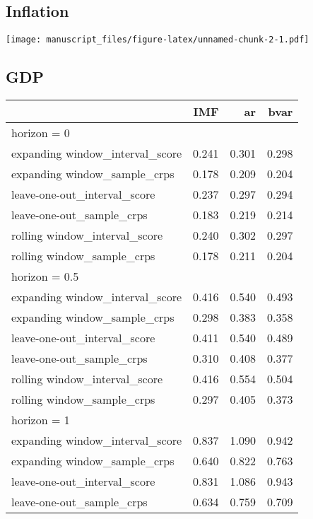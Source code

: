 \documentclass[
]{article}
\begin{document}
\hypertarget{inflation}{%
\subsection{Inflation}\label{inflation}}

\texttt{[image: manuscript\_files/figure-latex/unnamed-chunk-2-1.pdf]}

\hypertarget{gdp}{%
\subsection{GDP}\label{gdp}}

\begin{longtable}{l|rrr}
\toprule
\multicolumn{1}{l}{} & IMF & ar & bvar \\ 
\midrule
\multicolumn{4}{l}{horizon = 0} \\ 
\midrule
expanding window\_interval\_score & 0.241 & 0.301 & 0.298 \\ 
expanding window\_sample\_crps & 0.178 & 0.209 & 0.204 \\ 
leave-one-out\_interval\_score & 0.237 & 0.297 & 0.294 \\ 
leave-one-out\_sample\_crps & 0.183 & 0.219 & 0.214 \\ 
rolling window\_interval\_score & 0.240 & 0.302 & 0.297 \\ 
rolling window\_sample\_crps & 0.178 & 0.211 & 0.204 \\ 
\midrule
\multicolumn{4}{l}{horizon = 0.5} \\ 
\midrule
expanding window\_interval\_score & 0.416 & 0.540 & 0.493 \\ 
expanding window\_sample\_crps & 0.298 & 0.383 & 0.358 \\ 
leave-one-out\_interval\_score & 0.411 & 0.540 & 0.489 \\ 
leave-one-out\_sample\_crps & 0.310 & 0.408 & 0.377 \\ 
rolling window\_interval\_score & 0.416 & 0.554 & 0.504 \\ 
rolling window\_sample\_crps & 0.297 & 0.405 & 0.373 \\ 
\midrule
\multicolumn{4}{l}{horizon = 1} \\ 
\midrule
expanding window\_interval\_score & 0.837 & 1.090 & 0.942 \\ 
expanding window\_sample\_crps & 0.640 & 0.822 & 0.763 \\ 
leave-one-out\_interval\_score & 0.831 & 1.086 & 0.943 \\ 
leave-one-out\_sample\_crps & 0.634 & 0.759 & 0.709 \\ 

\end{longtable}
\end{document}
